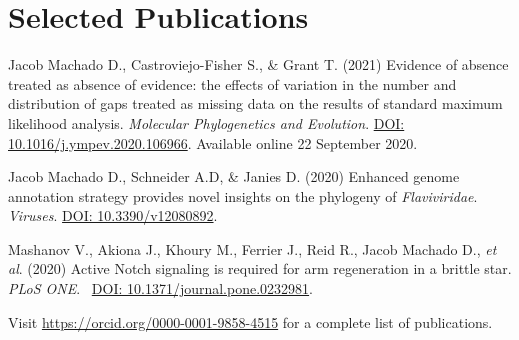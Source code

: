 
\section{Selected Publications}

	{
		\setlength{\parskip}{.2em}\renewcommand{\baselinestretch}{2.0}
		\begin{hangparas}{.25in}{1}
    
        Jacob Machado D., Castroviejo-Fisher S., \& Grant T. (2021) Evidence of absence treated as absence of evidence: the effects of variation in the number and distribution of gaps treated as missing data on the results of standard maximum likelihood analysis. \emph{Molecular Phylogenetics and Evolution}. \href{https://doi.org/10.1016/j.ympev.2020.106966}{DOI: 10.1016/j.ympev.2020.106966}. Available online 22 September 2020.
    
        Jacob Machado D., Schneider A.D, \& Janies D. (2020) Enhanced genome annotation strategy provides novel insights on the phylogeny of \emph{Flaviviridae}. \emph{Viruses}. \href{https://www.mdpi.com/1999-4915/12/8/892}{DOI: 10.3390/v12080892}.
	
	    Mashanov V., Akiona J., Khoury M., Ferrier J., Reid R., Jacob Machado D., \textit{et al}. (2020) Active Notch signaling is required for arm regeneration in a brittle star. \emph{PLoS ONE}. ~\href{https://doi.org/10.1371/journal.pone.0232981}{DOI: 10.1371/journal.pone.0232981}.

		\end{hangparas}
	}
    
    \vspace{1em}
    
    {\color{MyLightBlue} Visit \href{https://orcid.org/0000-0001-9858-4515}{https://orcid.org/0000-0001-9858-4515} for a complete list of publications.\\}